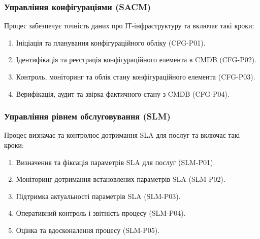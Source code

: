 \documentclass{article}
\begin{document}
\subsubsection{Управління конфігураціями (SACM)}
Процес забезпечує точність даних про ІТ-інфраструктуру та включає такі кроки:
\begin{enumerate}
    \item Ініціація та планування конфігураційного обліку (CFG-P01).
    \item Ідентифікація та реєстрація конфігураційного елемента в CMDB (CFG-P02).
    \item Контроль, моніторинг та облік стану конфігураційного елемента (CFG-P03).
    \item Верифікація, аудит та звірка фактичного стану з CMDB (CFG-P04).
\end{enumerate}

\subsubsection{Управління рівнем обслуговування (SLM)}
Процес визначає та контролює дотримання SLA для послуг та включає такі кроки:
\begin{enumerate}
    \item Визначення та фіксація параметрів SLA для послуг (SLM-P01).
    \item Моніторинг дотримання встановлених параметрів SLA (SLM-P02).
    \item Підтримка актуальності параметрів SLA (SLM-P03).
    \item Оперативний контроль і звітність процесу (SLM-P04).
    \item Оцінка та вдосконалення процесу (SLM-P05).
\end{enumerate}
\end{document}
